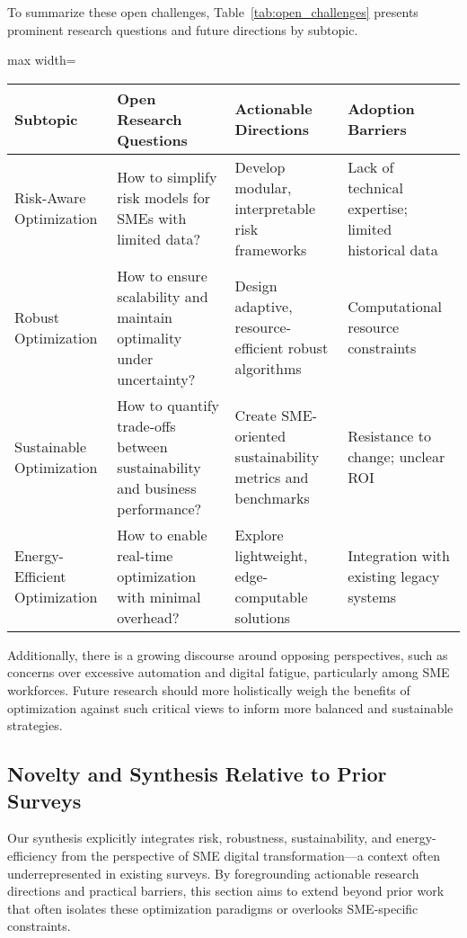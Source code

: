 \documentclass[sigconf]{acmart}
\begin{document}
To summarize these open challenges, Table~\ref{tab:open_challenges} presents prominent research questions and future directions by subtopic.

\begin{table*}[htbp]
\centering
\caption{Key Open Research Questions in Risk, Robust, Sustainable, and Energy-Efficient Optimization for SME Digital Transformation}
\label{tab:open_challenges}
\begin{adjustbox}{max width=\textwidth}
\begin{tabular}{@{}llll@{}}
\toprule
\textbf{Subtopic} & \textbf{Open Research Questions} & \textbf{Actionable Directions} & \textbf{Adoption Barriers} \\
\midrule
Risk-Aware Optimization & How to simplify risk models for SMEs with limited data? & Develop modular, interpretable risk frameworks & Lack of technical expertise; limited historical data \\
Robust Optimization & How to ensure scalability and maintain optimality under uncertainty? & Design adaptive, resource-efficient robust algorithms & Computational resource constraints \\
Sustainable Optimization & How to quantify trade-offs between sustainability and business performance? & Create SME-oriented sustainability metrics and benchmarks & Resistance to change; unclear ROI \\
Energy-Efficient Optimization & How to enable real-time optimization with minimal overhead? & Explore lightweight, edge-computable solutions & Integration with existing legacy systems \\
\bottomrule
\end{tabular}
\end{adjustbox}
\end{table*}

Additionally, there is a growing discourse around opposing perspectives, such as concerns over excessive automation and digital fatigue, particularly among SME workforces. Future research should more holistically weigh the benefits of optimization against such critical views to inform more balanced and sustainable strategies.

\subsection{Novelty and Synthesis Relative to Prior Surveys}

Our synthesis explicitly integrates risk, robustness, sustainability, and energy-efficiency from the perspective of SME digital transformation—a context often underrepresented in existing surveys. By foregrounding actionable research directions and practical barriers, this section aims to extend beyond prior work that often isolates these optimization paradigms or overlooks SME-specific constraints.
\end{document}

